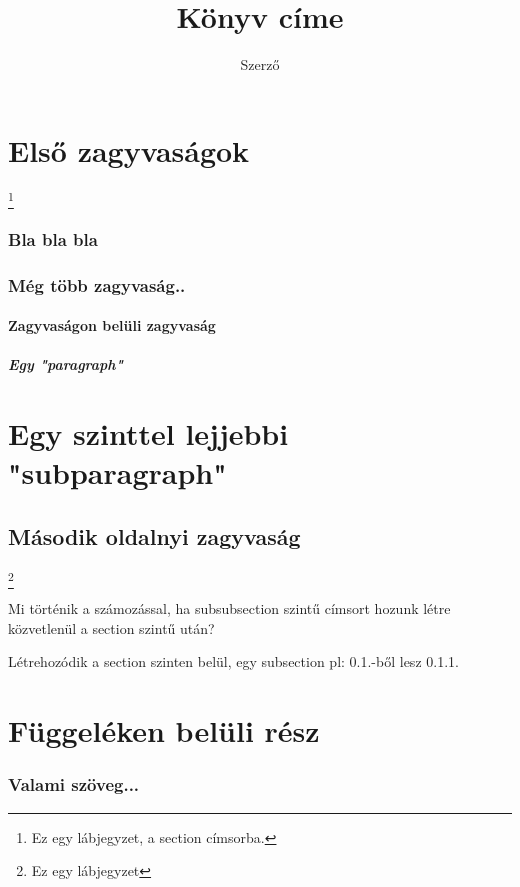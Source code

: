 \documentclass[12pt]{book}
\begin{document}
\title{Könyv címe}
\author{Szerző}
\maketitle

\tableofcontents
\newpage

\chapter[zagyvaság]{Első zagyvaságok}
\footnote{Ez egy lábjegyzet, a section címsorba.}
\subsection{Bla bla bla}
\hulipsum[2]  %
\subsection{Még több zagyvaság..}
\hulipsum[2]
\subsubsection{Zagyvaságon belüli zagyvaság}
\paragraph{Egy "paragraph"}
\chapter{Egy szinttel lejjebbi "subparagraph"}
\section{Második oldalnyi zagyvaság}
\hulipsum[2-3] \linebreak
\footnote{Ez egy lábjegyzet}

{
Mi történik a számozással, ha subsubsection szintű címsort hozunk létre
közvetlenül a section szintű után? \par
Létrehozódik a section szinten belül, egy subsection pl: 0.1.-ből lesz 0.1.1.
}

\appendix  %
\chapter{Függeléken belüli rész}
\subsection{Valami szöveg...}
\end{document}
